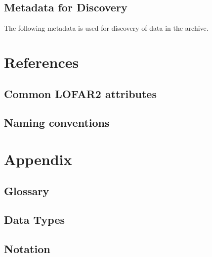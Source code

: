 \documentclass[a4paper,10pt,bibtotoc]{scrartcl}
\begin{document}

\subsection{Metadata for Discovery}
The following metadata is used for discovery of data in the archive. %


\section{References}

\subsection{Common LOFAR2 attributes}

\subsection{Naming conventions}






\clearpage

\appendix
\section{Appendix}

\subsection{Glossary}
\label{sec:glossary}




\subsection{Data Types}


\subsection{Notation}
\end{document}
